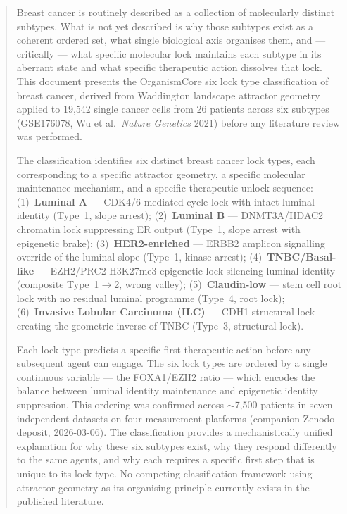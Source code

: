 \documentclass[12pt, a4paper]{article}
\begin{document}
\begin{abstract}
\noindent
Breast cancer is routinely described as a collection
of molecularly distinct subtypes. What is not yet
described is why those subtypes exist as a coherent
ordered set, what single biological axis organises
them, and --- critically --- what specific molecular
lock maintains each subtype in its aberrant state
and what specific therapeutic action dissolves that
lock. This document presents the OrganismCore
six lock type classification of breast cancer,
derived from Waddington landscape attractor geometry
applied to 19,542 single cancer cells from 26
patients across six subtypes (GSE176078, Wu et al.\
\textit{Nature Genetics} 2021) before any literature
review was performed.

The classification identifies six distinct breast
cancer lock types, each corresponding to a specific
attractor geometry, a specific molecular maintenance
mechanism, and a specific therapeutic unlock sequence:
(1)~\textbf{Luminal A} --- CDK4/6-mediated cycle lock
with intact luminal identity (Type~1, slope arrest);
(2)~\textbf{Luminal B} --- DNMT3A/HDAC2 chromatin
lock suppressing ER output (Type~1, slope arrest with
epigenetic brake); (3)~\textbf{HER2-enriched} ---
ERBB2 amplicon signalling override of the luminal
slope (Type~1, kinase arrest);
(4)~\textbf{TNBC/Basal-like} --- EZH2/PRC2
H3K27me3 epigenetic lock silencing luminal identity
(composite Type~1$\rightarrow$2, wrong valley);
(5)~\textbf{Claudin-low} --- stem cell root lock
with no residual luminal programme
(Type~4, root lock); (6)~\textbf{Invasive Lobular
Carcinoma (ILC)} --- CDH1 structural lock creating
the geometric inverse of TNBC (Type~3, structural
lock).

Each lock type predicts a specific first therapeutic
action before any subsequent agent can engage. The
six lock types are ordered by a single continuous
variable --- the FOXA1/EZH2 ratio --- which encodes
the balance between luminal identity maintenance and
epigenetic identity suppression. This ordering was
confirmed across $\sim$7,500 patients in seven
independent datasets on four measurement platforms
(companion Zenodo deposit, 2026-03-06). The
classification provides a mechanistically unified
explanation for why these six subtypes exist, why
they respond differently to the same agents, and why
each requires a specific first step that is unique
to its lock type. No competing classification
framework using attractor geometry as its organising
principle currently exists in the published literature.
\end{abstract}
\end{document}
